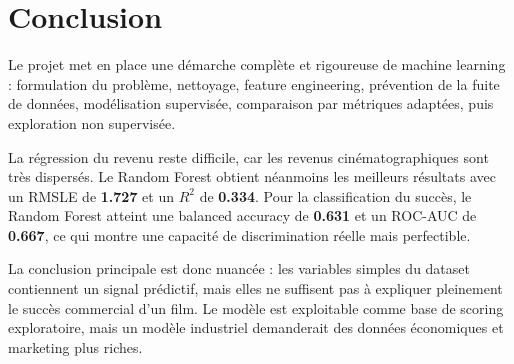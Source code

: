 \documentclass[11pt,a4paper]{article}
\begin{document}
\section{Conclusion}

Le projet met en place une démarche complète et rigoureuse de machine learning : formulation du problème, nettoyage, feature engineering, prévention de la fuite de données, modélisation supervisée, comparaison par métriques adaptées, puis exploration non supervisée.

La régression du revenu reste difficile, car les revenus cinématographiques sont très dispersés. Le Random Forest obtient néanmoins les meilleurs résultats avec un RMSLE de \textbf{1.727} et un $R^2$ de \textbf{0.334}. Pour la classification du succès, le Random Forest atteint une balanced accuracy de \textbf{0.631} et un ROC-AUC de \textbf{0.667}, ce qui montre une capacité de discrimination réelle mais perfectible.

La conclusion principale est donc nuancée : les variables simples du dataset contiennent un signal prédictif, mais elles ne suffisent pas à expliquer pleinement le succès commercial d'un film. Le modèle est exploitable comme base de scoring exploratoire, mais un modèle industriel demanderait des données économiques et marketing plus riches.
\end{document}
